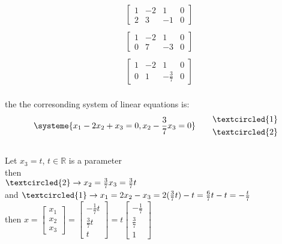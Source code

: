 \documentclass{jhwhw}
\begin{document}
\begin{align*} &\begin{bmatrix} 1 & -2 & 1 & 0 \\ 2 & 3 & -1 & 0 \end{bmatrix} \\ \\
&\begin{bmatrix} 1 & -2 & 1 & 0 \\ 0 & 7 & -3 & 0 \end{bmatrix}\\ \\
&\begin{bmatrix} 1 & -2 & 1 & 0 \\ 0 & 1 & -\frac{3}{7} & 0 \end{bmatrix} 
\end{align*}
\\

the the corresonding system of linear equations is:
\begin{align*} \systeme{x_1-2x_2+x_3=0, x_2 -\frac{3}{7}x_3 = 0} \quad \quad \begin{aligned} &\textcircled{1} \\ &\textcircled{2} \end{aligned} \end{align*}
\\

Let \(x_3 = t\), \(t \in \mathbb{R}\) is a parameter\\
then\\
\(\textcircled{2} \rightarrow x_2 = \frac{3}{7}x_3 = \frac{3}{7}t\)\\
and \(\textcircled{1} \rightarrow x_1 = 2x_2 - x_3 = 2(\frac{3}{7}t) - t = \frac{6}{7}t - t = -\frac{t}{7}\)
\\

then \(x = \begin{bmatrix} x_1 \\ x_2 \\ x_3 \end{bmatrix} = \begin{bmatrix} -\frac{1}{7}t  \\ \frac{3}{7}t \\  t \end{bmatrix} = t \begin{bmatrix} -\frac{1}{7} \\ \frac{3}{7} \\ 1 \end{bmatrix}\)\\
\end{document}
